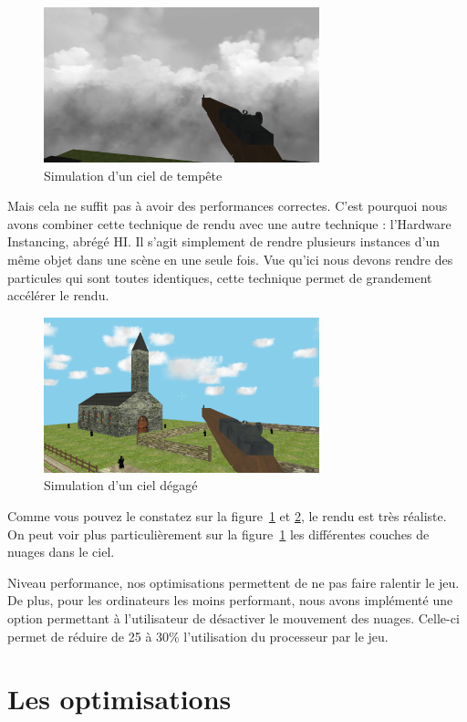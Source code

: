 \documentclass[11pt]{report}
\begin{document}
\begin{figure}[htbp]
\centering
\includegraphics[width=8cm]{ciel_vue_haut.png}
\caption{Simulation d'un ciel de tempête}
\label{ciel-tempete}
\end{figure}

Mais cela ne suffit pas à avoir des performances correctes. C'est pourquoi nous avons combiner cette technique de rendu avec une autre technique : l'Hardware Instancing, abrégé HI. Il s'agit simplement de rendre plusieurs instances d'un même objet dans une scène en une seule fois. Vue qu'ici nous devons rendre des particules qui sont toutes identiques, cette technique permet de grandement accélérer le rendu.

\begin{figure}[htbp]
\centering
\includegraphics[width=8cm]{ciel_claire.png}
\caption{Simulation d'un ciel dégagé}
\label{ciel-bleu}
\end{figure}

Comme vous pouvez le constatez sur la figure~\ref{ciel-tempete} et \ref{ciel-bleu}, le rendu est très réaliste. On peut voir plus particulièrement sur la figure~\ref{ciel-tempete} les différentes couches de nuages dans le ciel.

Niveau performance, nos optimisations permettent de ne pas faire ralentir le jeu. De plus, pour les ordinateurs les moins performant, nous avons implémenté une option permettant à l'utilisateur de désactiver le mouvement des nuages. Celle-ci permet de réduire de 25 à 30\% l'utilisation du processeur par le jeu.

\section{Les optimisations}
\end{document}
